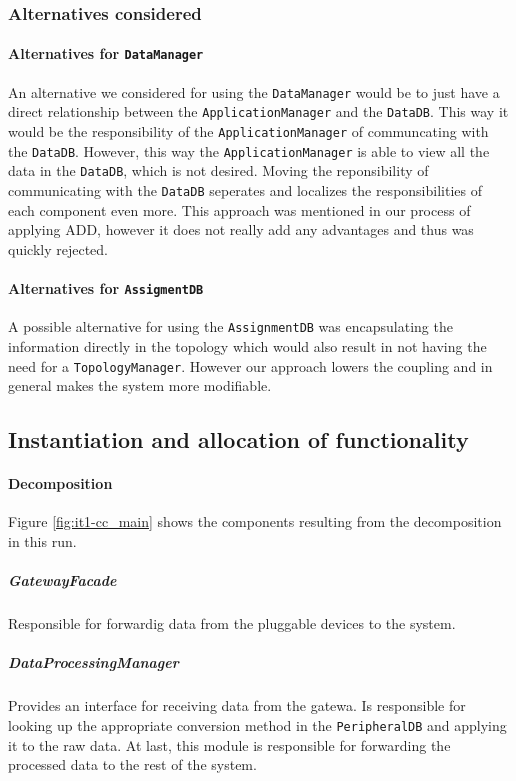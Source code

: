 \documentclass[english]{sareport}
\begin{document}
\subsubsection*{Alternatives considered}
\paragraph{Alternatives for \texttt{DataManager}}
An alternative we considered for using the \texttt{DataManager} would be to just have a direct relationship between the \texttt{ApplicationManager} and the \texttt{DataDB}. This way it would be the responsibility of the \texttt{ApplicationManager} of communcating with the \texttt{DataDB}. However, this way the \texttt{ApplicationManager} is able to view all the data in the \texttt{DataDB}, which is not desired. Moving the reponsibility of communicating with the \texttt{DataDB} seperates and localizes the responsibilities of each component even more. This approach was mentioned in our process of applying ADD, however it does not really add any advantages and thus was quickly rejected.
	
\paragraph{Alternatives for \texttt{AssigmentDB}}
A possible alternative for using the \texttt{AssignmentDB} was encapsulating the information directly in the topology which would also result in not having the need for a \texttt{TopologyManager}. However our approach lowers the coupling and in general makes the system more modifiable.

\subsection{Instantiation and allocation of functionality}
\paragraph{Decomposition}
Figure \ref{fig:it1-cc_main} shows the components resulting from the decomposition in this run. 


\subparagraph{GatewayFacade}
Responsible for forwardig data from the pluggable devices to the system.

\subparagraph{DataProcessingManager}
Provides an interface for receiving data from the gatewa. Is responsible for looking up the appropriate conversion method in the \texttt{PeripheralDB} and applying it to the raw data. At last, this module is responsible for forwarding the processed data to the rest of the system.
\end{document}

